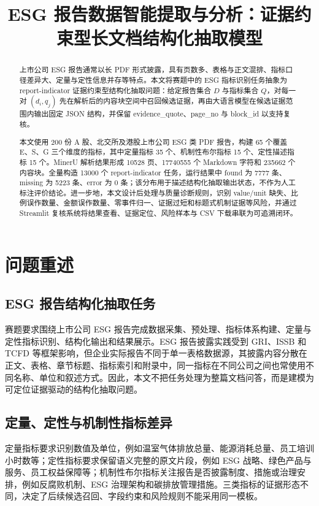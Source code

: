 \documentclass[bwprint]{gmcmthesis}
\title{ESG 报告数据智能提取与分析：证据约束型长文档结构化抽取模型}
\numberwithin{figure}{section}
\begin{document}
\maketitle

\begin{abstract}
上市公司 ESG 报告通常以长 PDF 形式披露，具有页数多、表格与正文混排、指标口径差异大、定量与定性信息并存等特点。本文将赛题中的 ESG 指标识别任务抽象为 report-indicator 证据约束型结构化抽取问题：给定报告集合 $D$ 与指标集合 $Q$，对每一对 $(d_i,q_j)$ 先在解析后的内容块空间中召回候选证据，再由大语言模型在候选证据范围内输出固定 JSON 结构，并保留 evidence\_quote、page\_no 与 block\_id 以支持复核。

本文使用 200 份 A 股、北交所及港股上市公司 ESG 类 PDF 报告，构建 65 个覆盖 E、S、G 三个维度的指标，其中定量指标 35 个、机制性布尔指标 15 个、定性描述指标 15 个。MinerU 解析结果形成 10528 页、17740555 个 Markdown 字符和 235662 个内容块。全量构造 13000 个 report-indicator 任务，运行结果中 found 为 7777 条、missing 为 5223 条、error 为 0 条；该分布用于描述结构化抽取输出状态，不作为人工标注评价结论。进一步地，本文设计后处理与质量诊断规则，识别 value/unit 缺失、比例误作数量、金额误作数量、零事件归一、证据过短和标题式机制证据等风险，并通过 Streamlit 复核系统将结果查看、证据定位、风险样本与 CSV 下载串联为可追溯闭环。

\end{abstract}

\tableofcontents
\newpage

\section{问题重述}
\subsection{ESG 报告结构化抽取任务}
赛题要求围绕上市公司 ESG 报告完成数据采集、预处理、指标体系构建、定量与定性指标识别、结构化输出和结果展示。ESG 报告披露实践受到 GRI、ISSB 和 TCFD 等框架影响\parencite{gri2021,issb2023,tcfd2017}，但企业实际报告不同于单一表格数据源，其披露内容分散在正文、表格、章节标题、指标索引和附录中，同一指标在不同公司之间也常使用不同名称、单位和叙述方式。因此，本文不把任务处理为整篇文档问答，而是建模为可定位证据驱动的结构化抽取问题。

\subsection{定量、定性与机制性指标差异}
定量指标要求识别数值及单位，例如温室气体排放总量、能源消耗总量、员工培训小时数等；定性指标要求保留语义完整的原文片段，例如 ESG 战略、绿色产品与服务、员工权益保障等；机制性布尔指标关注报告是否披露制度、措施或治理安排，例如反腐败机制、ESG 治理架构和碳排放管理措施。三类指标的证据形态不同，决定了后续候选召回、字段约束和风险规则不能采用同一模板。
\end{document}
